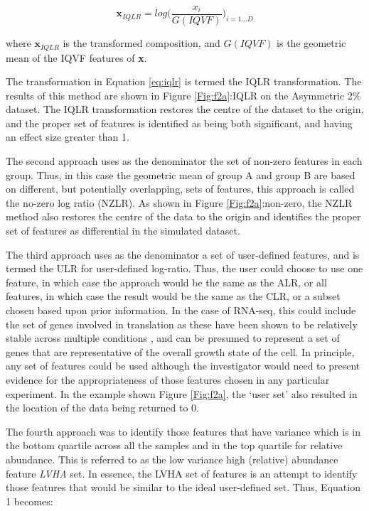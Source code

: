 \documentclass{bmcart}
\begin{document}
\begin{equation}
\textbf{x}_{IQLR} = log  \big( \frac{x_i}{G(IQVF)}   \big)_{i=1 \dots D}
\label{eq:iqlr}
\end{equation}

where $\textbf{x}_{IQLR}$ is the transformed composition, and 	$G(IQVF)$ is the geometric mean of the IQVF features of \textbf{x}. 
 
 
The transformation in Equation \ref{eq:iqlr} is termed the IQLR transformation. The results of this method are shown in Figure \ref{Fig:f2a}:IQLR on the Asymmetric 2\% dataset. The IQLR transformation restores the centre of the dataset to the origin, and the proper set of features is identified as being both significant, and having an effect size greater than 1.


The second approach uses as the denominator the set of non-zero features in each group.  Thus, in this case the geometric mean of group A and group B are based on different, but potentially overlapping, sets of features, this approach is called the no-zero log ratio (NZLR). As shown in Figure \ref{Fig:f2a}:non-zero, the NZLR method also restores the centre of the data to the origin and identifies the proper set of features as differential in the simulated dataset. 



The  third  approach uses as the denominator a set of user-defined features, and is termed the ULR for user-defined log-ratio. Thus, the user could choose to use one feature, in which case the approach would be the same as the ALR, or all features, in which case the result would be the same as the CLR, or a subset chosen based upon prior information. In the case of RNA-seq, this could include the set of genes involved in translation as these have been shown to be relatively stable across multiple conditions \cite{Scott:2010}, and can be presumed to represent a set of genes that are representative of the overall growth state of the cell. In principle, any set of features could be used although the investigator would need to present evidence for the  appropriateness of those features chosen in any particular experiment. In the example shown Figure \ref{Fig:f2a}, the `user set' also resulted in the location of the data being returned to 0. 

The fourth approach was to identify those features that have variance which is in the bottom quartile across all the samples and in the top quartile for relative abundance. This is referred to as the low variance high (relative) abundance feature \textit{LVHA} set. In essence, the LVHA set of features is an attempt to identify those features that would be similar to the ideal user-defined set. Thus, Equation 1 becomes:
\end{document}
